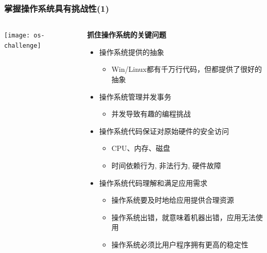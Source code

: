 \begin{frame}
    \frametitle{掌握操作系统具有挑战性(1)}
    
    \begin{columns}
    	
    \begin{column}{0.3\textwidth}	
      \texttt{[image: os-challenge]}	
    \end{column}

	\begin{column}{0.7\textwidth}
    
    \textbf{抓住操作系统的关键问题}
    \begin{itemize}
        \item 操作系统提供的抽象
            \begin{itemize}
                \item Win/Linux都有千万行代码，但都提供了很好的抽象
            \end{itemize} \pause
        \item 操作系统管理并发事务
            \begin{itemize}
                \item 并发导致有趣的编程挑战
            \end{itemize} \pause
        \item 操作系统代码保证对原始硬件的安全访问
            \begin{itemize}
               \item CPU、内存、磁盘
                \item 时间依赖行为, 非法行为, 硬件故障
            \end{itemize} \pause
        \item 操作系统代码理解和满足应用需求 \pause
            \begin{itemize}
            	\item 操作系统要及时地给应用提供合理资源
                \item 操作系统出错，就意味着机器出错，应用无法使用
                \item 操作系统必须比用户程序拥有更高的稳定性
            \end{itemize}
        
    \end{itemize}
    \end{column}

    \end{columns}

\end{frame}


